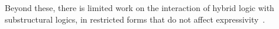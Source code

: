 Beyond these, there is limited work on the interaction of hybrid logic with substructural logics, in restricted forms
that do not affect expressivity~\cite{despeyroux2014hybrid,chaudhuri2019hybrid}.


